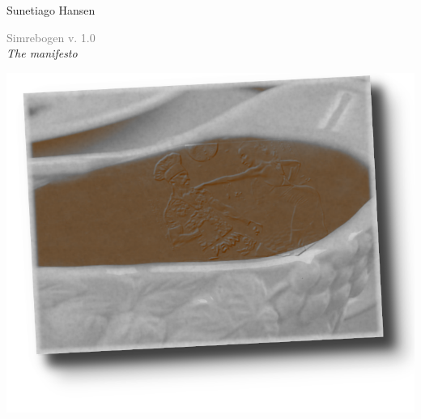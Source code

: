 

\begin{titlepage} %

	\raggedleft %
	
	\vspace*{\baselineskip} %
	
	
	{\Large Sunetiago Hansen} %
	
	\vspace*{0.167\textheight} %
	
	
	
	{\textcolor{Gray}{\Huge Simrebogen v. 1.0}}\\[\baselineskip] %
	
	{\Large\textit{The \sovs manifesto}} %
	
	\vfill %
	\begin{center}
           \includegraphics[scale=2.2]{Frontpage/sovs-front-page}
	\end{center}

	
	
	\vspace*{3\baselineskip} %

\end{titlepage}
